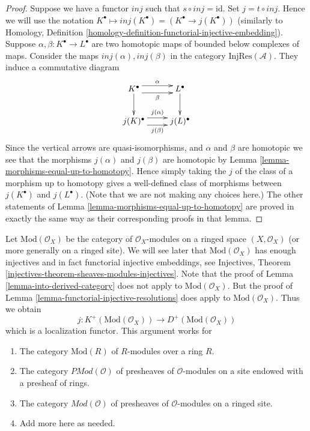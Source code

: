 \begin{proof}
\medskip\noindent
Suppose we have a functor $inj$ such that $s \circ inj = \text{id}$.
Set $j = t \circ inj$. Hence we will use the notation
$K^\bullet \mapsto inj(K^\bullet) = (K^\bullet \to j(K^\bullet))$
(similarly to
Homology, Definition \ref{homology-definition-functorial-injective-embedding}).
Suppose $\alpha , \beta : K^\bullet \to L^\bullet$ are two homotopic
maps of bounded below complexes of maps. Consider the maps
$inj(\alpha), inj(\beta)$ in the category $\text{InjRes}(\mathcal{A})$.
They induce a commutative diagram
$$
\xymatrix{
K^\bullet
\ar@<1ex>[r]^-{\alpha} \ar@<-1ex>[r]_-{\beta}
\ar[d] &
L^\bullet \ar[d] \\
j(K)^\bullet
\ar@<1ex>[r]^-{j(\alpha)} \ar@<-1ex>[r]_-{j(\beta)}
&
j(L)^\bullet
}
$$
Since the vertical arrows are quasi-isomorphisms, and $\alpha$ and $\beta$
are homotopic we see that
the morphisms $j(\alpha)$ and $j(\beta)$ are homotopic
by Lemma \ref{lemma-morphisms-equal-up-to-homotopy}. Hence
simply taking the $j$ of the class of a morphism up to
homotopy gives a well-defined class of morphisms between
$j(K^\bullet)$ and $j(L^\bullet)$. (Note that we are not
making any choices here.) The other statements of
Lemma \ref{lemma-morphisms-equal-up-to-homotopy}
are proved in exactly the same way as their corresponding proofs
in that lemma.
\end{proof}

\begin{remark}
\label{remark-big-abelian-category}
Let $\text{Mod}(\mathcal{O}_X)$ be the category of $\mathcal{O}_X$-modules
on a ringed space $(X, \mathcal{O}_X)$ (or more generally on a
ringed site). We will see later that $\text{Mod}(\mathcal{O}_X)$ has enough
injectives and in fact functorial injective embeddings, see
Injectives, Theorem \ref{injectives-theorem-sheaves-modules-injectives}.
Note that the proof of Lemma \ref{lemma-into-derived-category} does
not apply to $\text{Mod}(\mathcal{O}_X)$. But the proof of
Lemma \ref{lemma-functorial-injective-resolutions} does apply
to $\text{Mod}(\mathcal{O}_X)$. Thus we obtain
$$
j : K^{+}(\text{Mod}(\mathcal{O}_X))
\longrightarrow
D^{+}(\text{Mod}(\mathcal{O}_X))
$$
which is a localization functor. This argument works for
\begin{enumerate}
\item The category $\text{Mod}(R)$ of $R$-modules over a ring $R$.
\item The category $\textit{PMod}(\mathcal{O})$ of presheaves of
$\mathcal{O}$-modules on a site endowed with a presheaf of rings.
\item The category $\textit{Mod}(\mathcal{O})$ of presheaves of
$\mathcal{O}$-modules on a ringed site.
\item Add more here as needed.
\end{enumerate}
\end{remark}




